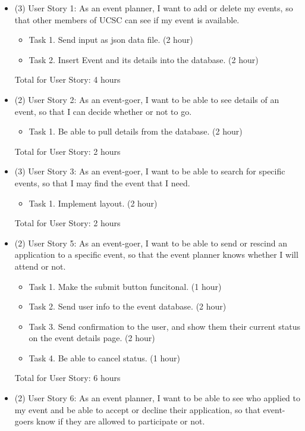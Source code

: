 \documentclass[10pt]{article}
\begin{document}
        \begin{itemize}
            \item (3) User Story 1: As an event planner, I want to add or delete my events, so that other members of UCSC can see if my event is available.

                \begin{itemize}
                    \item Task 1. Send input as json data file. (2 hour)
                    \item Task 2. Insert Event and its details into the database. (2 hour)
                \end{itemize}        
                Total for User Story: 4 hours
            \item (2) User Story 2: As an event-goer, I want to be able to see details of an event, so that I can decide whether or not to go.
            
                \begin{itemize}
		            \item Task 1. Be able to pull details from the database. (2 hour)
                \end{itemize}
                Total for User Story: 2 hours
            \item (3) User Story 3: As an event-goer, I want to be able to search for specific events, so that I may find the event that I need.
            
                \begin{itemize}
                    \item Task 1. Implement layout. (2 hour)
                \end{itemize}
                Total for User Story: 2 hours
            
            \item (2) User Story 5: As an event-goer, I want to be able to send or rescind an application to a specific event, so that the event planner knows whether I will attend or not.
        
                \begin{itemize}
                    \item Task 1. Make the submit button funcitonal. (1 hour)
		    \item Task 2. Send user info to the event database. (2 hour)
		    \item Task 3. Send confirmation to the user, and show them their current status on the event details page. (2 hour)
		    \item Task 4. Be able to cancel status. (1 hour)
                \end{itemize}
                Total for User Story: 6 hours
	    \item (2) User Story 6: As an event planner, I want to be able to see who applied to my event and be able to accept or decline their application, so that event-goers know if they are allowed to participate or not.


\end{itemize}
\end{document}
